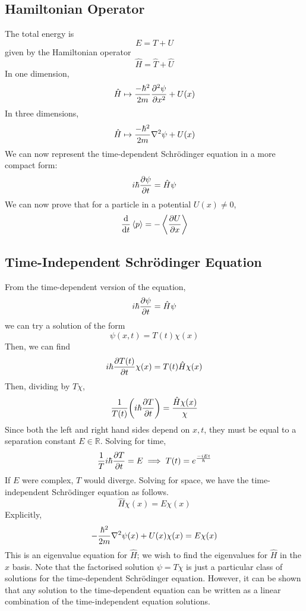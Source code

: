 \subsection{Hamiltonian Operator}
The total energy is
\[ E = T + U \]
given by the Hamiltonian operator
\[ \hat H = \hat T + \hat U \]
In one dimension,
\[ \hat H \mapsto \frac{-\hbar^2}{2m} \pdv[2]{\psi}{x} + U(x) \]
In three dimensions,
\[ \hat H \mapsto \frac{-\hbar^2}{2m} \laplacian \psi + U(x) \]
We can now represent the time-dependent Schr\"odinger equation in a more compact form:
\[ i\hbar \pdv{\psi}{t} = \hat H \psi \]
We can now prove that for a particle in a potential \( U(x) \neq 0 \),
\[ \dv{t} \left\langle{p}\right\rangle = -\left\langle{\pdv{U}{x}}\right\rangle \]

\subsection{Time-Independent Schr\"odinger Equation}
From the time-dependent version of the equation,
\[ i\hbar \pdv{\psi}{t} = \hat H \psi \]
we can try a solution of the form
\[ \psi(x,t) = T(t) \chi(x) \]
Then, we can find
\[ i \hbar \pdv{T(t)}{t} \chi(x) = T(t) \hat H \chi(x) \]
Then, dividing by \( T \chi \),
\[ \frac{1}{T(t)} \qty(i \hbar \pdv{T}{t}) = \frac{\hat H \chi(x)}{\chi} \]
Since both the left and right hand sides depend on \( x, t \), they must be equal to a separation constant \( E \in \mathbb R \).
Solving for time,
\[ \frac{1}{T} i \hbar \pdv{T}{t} = E \implies T(t) = e^{\frac{-i Et}{\hbar}} \]
If \( E \) were complex, \( T \) would diverge.
Solving for space, we have the time-independent Schr\"odinger equation as follows.
\[ \hat H \chi(x) = E \chi(x) \]
Explicitly,
\[ -\frac{\hbar^2}{2m} \laplacian{\psi(x)} + U(x) \chi(x) = E \chi(x) \]
This is an eigenvalue equation for \( \hat H \); we wish to find the eigenvalues for \( \hat H \) in the \( x \) basis.
Note that the factorised solution \( \psi = T \chi \) is just a particular class of solutions for the time-dependent Schr\"odinger equation.
However, it can be shown that any solution to the time-dependent equation can be written as a linear combination of the time-independent equation solutions.
